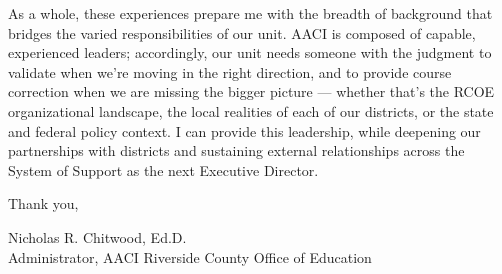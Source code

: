 \documentclass[11pt, letterpaper]{article}
\begin{document}
{As a whole, these experiences prepare me with the breadth of background that bridges the varied responsibilities of our unit. AACI is composed of capable, experienced leaders; accordingly, our unit needs someone with the judgment to validate when we're moving in the right direction, and to provide course correction when we are missing the bigger picture --- whether that's the RCOE organizational landscape, the local realities of each of our districts, or the state and federal policy context. I can provide this leadership, while deepening our partnerships with districts and sustaining external relationships across the System of Support as the next Executive Director.

\vspace{2mm}
Thank you,

\vspace{10mm}
{\InterTightSemiBold Nicholas R. Chitwood, Ed.D.}\\[0.5mm]
{\fontsize{10}{13}\InterTightRegular\color{muted}Administrator, AACI \textcolor{accent}{\textperiodcentered} Riverside County Office of Education}
}\par
\end{document}
